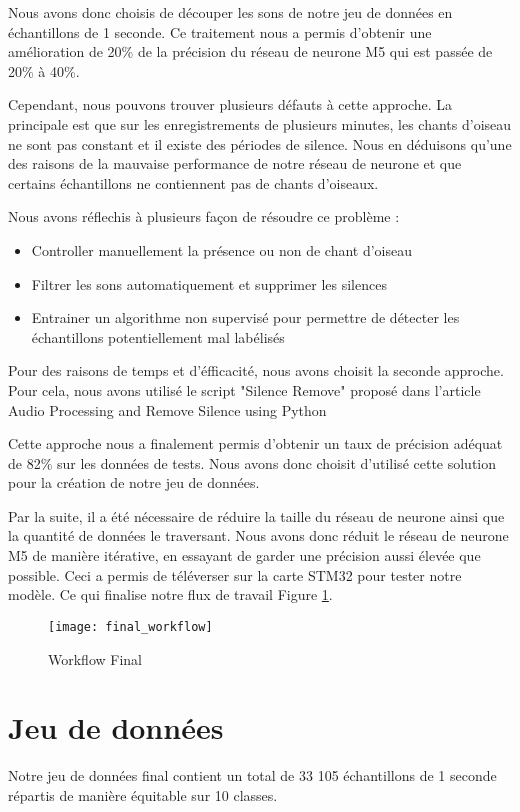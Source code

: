Nous avons donc choisis de découper les sons de notre jeu de données en échantillons de 1 seconde.
Ce traitement nous a permis d'obtenir une amélioration de 20\% de la précision 
du réseau de neurone M5 qui est passée de 20\% à 40\%. 

Cependant, nous pouvons trouver plusieurs défauts à cette approche. La principale est que sur les enregistrements de plusieurs minutes,
les chants d'oiseau ne sont pas constant et il existe des périodes de silence. 
Nous en déduisons qu'une des raisons de la mauvaise performance de notre réseau de neurone 
et que certains échantillons ne contiennent pas de chants d'oiseaux. 

\pagebreak
Nous avons réflechis à plusieurs façon de résoudre ce problème : 
\begin{itemize}
  \item Controller manuellement la présence ou non de chant d'oiseau 
  \item Filtrer les sons automatiquement et supprimer les silences
  \item Entrainer un algorithme non supervisé pour permettre de détecter les échantillons potentiellement mal labélisés
\end{itemize}

Pour des raisons de temps et d'éfficacité, nous avons choisit la seconde approche. Pour cela, nous avons
utilisé le script "Silence Remove" proposé dans l'article Audio Processing and Remove Silence using Python \cite{DataCleaning}
 
Cette approche nous a finalement permis d'obtenir un taux de précision adéquat de 82\% sur les données de tests.
Nous avons donc choisit d'utilisé cette solution pour la création de notre jeu de données.

Par la suite, il a été nécessaire de réduire la taille du réseau de neurone ainsi que la quantité de données le traversant.
Nous avons donc réduit le réseau de neurone M5 de manière itérative, en essayant de garder une précision aussi élevée que possible.
Ceci a permis de téléverser sur la carte STM32 pour tester notre modèle.
Ce qui finalise notre flux  de travail Figure \ref{graph:final_workflow}.

\begin{figure}[!ht]
  \texttt{[image: final\_workflow]}
  \centering
  \caption{Workflow Final}
  \label{graph:final_workflow}
\end{figure}


\section{Jeu de données}
Notre jeu de données final contient un total de 33 105 échantillons de 1 seconde 
répartis de manière équitable sur 10 classes.

